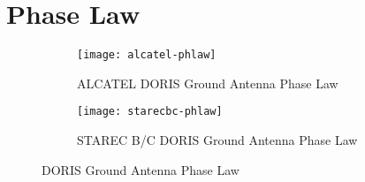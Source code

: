 \section{Phase Law}

\begin{figure}
\begin{subfigure}{0.45\textwidth}
  \centering
  \texttt{[image: alcatel-phlaw]}  
  \caption{\scriptsize ALCATEL DORIS Ground Antenna Phase Law}
  \label{fig:sub-first}
\end{subfigure}
\begin{subfigure}{0.45\textwidth}
  \centering
  \texttt{[image: starecbc-phlaw]}  
  \caption{\scriptsize STAREC B/C DORIS Ground Antenna Phase Law}
  \label{fig:sub-first}
\end{subfigure}
\caption{DORIS Ground Antenna Phase Law}
\label{fig:ground-antenna-phase-law}
\end{figure}